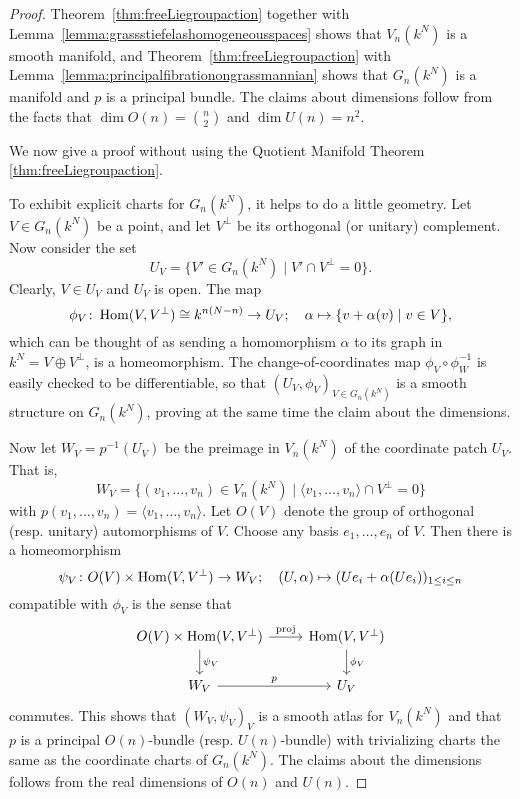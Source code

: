 \documentclass[a4paper,openany]{scrbook}
\begin{document}
\begin{proof}
Theorem~\ref{thm:freeLiegroupaction} together with Lemma~\ref{lemma:grassstiefelashomogeneousspaces} shows that $V_n(k^N)$ is a smooth manifold, and Theorem~\ref{thm:freeLiegroupaction} with Lemma~\ref{lemma:principalfibrationongrassmannian} shows that $G_n(k^N)$ is a manifold and $p$ is a principal bundle.
The claims about dimensions follow from the facts that $\dim O(n) = {n \choose 2}$ and $\dim U(n) = n^2$.

We now give a proof without using the Quotient Manifold Theorem \ref{thm:freeLiegroupaction}. 

To exhibit explicit charts for $G_n(k^N)$, it helps to do a little geometry. Let $V \in G_n(k^N)$ be a point, and let $V^\perp$ be its orthogonal (or unitary) complement. Now consider the set
\begin{equation}\label{eq:grassmanncharts}
U_V = \{ V' \in G_n(k^N) \mid V' \cap V^\perp = 0\}.
\end{equation}
Clearly, $V \in U_V$ and $U_V$ is open. The map
\[
\phi_V\colon \operatorname{Hom}(V,V^\perp) \cong k^{n(N-n)} \to U_V; \quad \alpha \mapsto \{v+\alpha(v) \mid v \in V\},
\]
which can be thought of as sending a homomorphism $\alpha$ to its graph in $k^N = V \oplus V^\perp$, is a homeomorphism. The change-of-coordinates map $\phi_V \circ \phi_W^{-1}$ is easily checked to be differentiable, so that $(U_V,\phi_V)_{V \in G_n(k^N)}$ is a smooth structure on $G_n(k^N)$, proving at the same time the claim about the dimensions.

Now let $W_V = p^{-1}(U_V)$ be the preimage in $V_n(k^N)$ of the coordinate patch $U_V$. That is,
\[
W_V = \{(v_1,\dots,v_n) \in V_n(k^N) \mid \langle v_1,\dots,v_n\rangle \cap V^\perp = 0\}
\]
with $p(v_1,\dots,v_n) = \langle v_1,\dots,v_n\rangle$. Let $O(V)$ denote the group of orthogonal (resp. unitary) automorphisms of $V$. Choose any basis $e_1,\dots,e_n$ of $V$. Then there is a homeomorphism
\[
\psi_V\colon O(V) \times \operatorname{Hom}(V,V^\perp) \to W_V; \quad (U,\alpha) \mapsto (Ue_i+\alpha(Ue_i))_{1 \leq i \leq n}
\]
compatible with $\phi_V$ is the sense that
\[
\begin{tikzcd}
O(V) \times \Hom(V,V^\perp) \arrow[r,"\text{proj}"] \arrow[d,"\psi_V"] & \Hom(V,V^\perp) \arrow[d,"\phi_V"]\\
W_V \arrow[r,"p"] & U_V
\end{tikzcd}
\]
commutes. This shows that $(W_V,\psi_V)_V$ is a smooth atlas for $V_n(k^N)$ and that $p$ is a principal $O(n)$-bundle (resp. $U(n)$-bundle) with trivializing charts the same as the coordinate charts of $G_n(k^N)$. The claims about the dimensions follows from the real dimensions of $O(n)$ and $U(n)$.
\end{proof}
\end{document}
